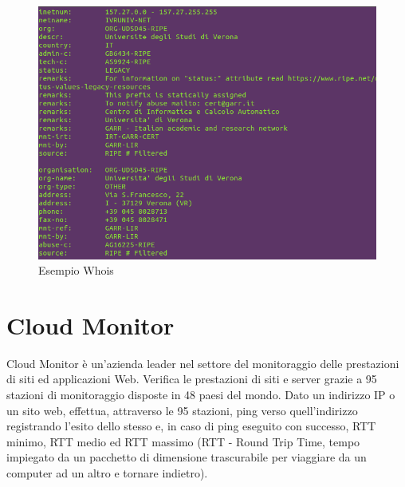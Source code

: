 \documentclass[a4paper,11pt]{book}
\begin{document}
~

\begin{figure}[!ht]
\centering
\includegraphics[scale = 0.7]{Whois.png}
\caption{Esempio Whois}
\end{figure}

\clearpage

\section{Cloud Monitor}
Cloud Monitor \`e un'azienda leader nel settore del monitoraggio delle prestazioni di siti ed applicazioni Web. Verifica le prestazioni di siti e server grazie a 95 stazioni di monitoraggio disposte in 48 paesi del mondo. 
Dato un indirizzo IP o un sito web, effettua, attraverso le 95 stazioni, ping verso quell'indirizzo registrando l'esito dello stesso e, in caso di ping eseguito con successo, RTT minimo, RTT medio ed RTT massimo (RTT - Round Trip Time, tempo impiegato da un pacchetto di dimensione trascurabile per viaggiare da un computer ad un altro e tornare indietro). 

~
\end{document}
